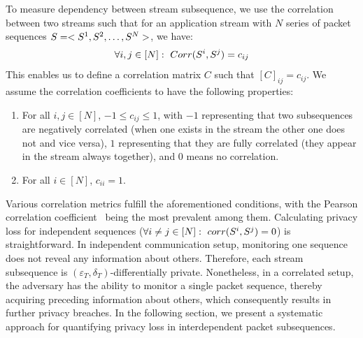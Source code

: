 To measure dependency between stream subsequence, we use the correlation between two streams such that for an application stream with $N$ series of packet sequences $S = <S^1, S^2, \dots, S^N>$, we have:
\begin{equation*}
  \forall i,j \in [N]:~Corr(S^i, S^j) = c_{ij}
\end{equation*}
\noindent
This enables us to define a correlation matrix $C$ such that $[C]_{ij}=c_{ij}$.
We assume the correlation coefficients to have the following properties:
\begin{enumerate}
  \item For all $i,j \in [N]$, $-1 \leq c_{ij} \leq 1$, with $-1$ representing that two subsequences are negatively correlated (\ie when one exists in the stream the other one does not and vice versa), $1$ representing that they are fully correlated (\ie they appear in the stream always together), and $0$ means no correlation.
  \item For all $i \in [N]$, $c_{ii} = 1$.
\end{enumerate}
Various correlation metrics fulfill the aforementioned conditions, with the Pearson correlation coefficient~\cite{cohen2009pearson} being the most prevalent among them. 
\noindent
Calculating privacy loss for independent sequences (\ie $\forall i \neq j \in [N]:~corr(S^i, S^j) = 0$) is straightforward. 
In independent communication setup, monitoring one sequence does not reveal any information about others. 
Therefore, each stream subsequence is $(\varepsilon_T, \delta_T)$-differentially private.
Nonetheless, in a correlated setup, the adversary has the ability to monitor a single packet sequence, thereby acquiring preceding information about others, which consequently results in further privacy breaches. 
In the following section, we present a systematic approach for quantifying privacy loss in interdependent packet subsequences.
















